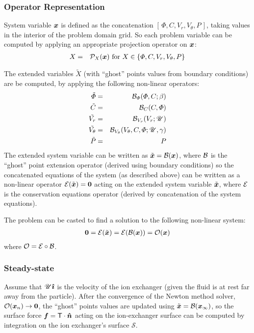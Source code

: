 \subsubsection{Operator Representation}
System variable $\boldsymbol{x}$ is defined as the concatenation $[\,\varPhi, C, V_r, V_\theta, P\,]$,
taking values in the interior of the problem domain grid.
So each problem variable can be computed by applying an appropriate projection operator
on $\boldsymbol{x}$:
\begin{eqnarray}
X &=& \mathcal{P}_X(\boldsymbol{x}) \mbox{ for } X \in \left\{\varPhi, C, V_r, V_\theta, P\right\}
\end{eqnarray}

The extended variables $\tilde X$ (with ``ghost'' points values 
from boundary conditions) are be computed, by applying the following non-linear operators:
\begin{eqnarray}
\tilde{\varPhi} &=& \mathcal{B}_\varPhi(\varPhi, C; \beta) \\
\tilde{C} &=& \mathcal{B}_C(C, \varPhi) \\
\tilde{V_r} &=& \mathcal{B}_{V_r}(V_r; \mathscr{U}) \\
\tilde{V_\theta} &=& \mathcal{B}_{V_\theta}(V_\theta, C, \varPhi; \mathscr{U}, \gamma) \\
\tilde{P} &=& P
\end{eqnarray}
The extended system variable can be written as $\tilde{\boldsymbol{x}} = \mathcal{B}(\boldsymbol{x})$, 
where $\mathcal{B}$ is the ``ghost'' point extension operator (derived using boundary conditions)
so the concatenated equations of the system (as described above) can be written 
as a non-linear operator $\mathcal{E}(\tilde{\boldsymbol{x}}) = \boldsymbol{0}$ acting on the extended system variable 
$\tilde{\boldsymbol{x}}$, where $\mathcal{E}$ is the conservation equations operator 
(derived by concatenation of the system equations).

The problem can be casted to find a solution to the following non-linear system:
\begin{eqnarray}
\boldsymbol{0} = \mathcal{E} (\tilde{\boldsymbol{x}}) = \mathcal{E} (\mathcal{B} (\boldsymbol{x})) = \mathcal{O}(\boldsymbol{x})
\end{eqnarray}
 where $\mathcal{O} = \mathcal{E} \circ \mathcal{B}$.

\subsubsection{Steady-state}
Assume that $\mathscr{U} \boldsymbol{\hat{\imath}}$ is the velocity of the ion exchanger 
(given the fluid is at rest far away from the particle).
After the convergence of the Newton method solver, $\mathcal{O}(\boldsymbol{x}_n) \rightarrow \boldsymbol{0}$, 
the ``ghost'' points values are updated using $\tilde{\boldsymbol{x}} = \mathcal{B}(\boldsymbol{x}_\infty)$,
so the surface force $\boldsymbol{f} = \mathsf{T} \cdot \boldsymbol{\hat{n}}$ acting on the ion-exchanger surface
can be computed by integration on the ion exchanger's surface $\mathcal S$.

